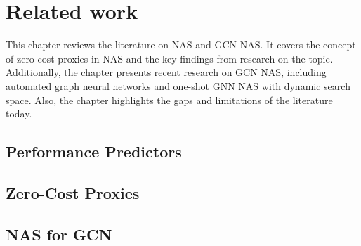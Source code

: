 \chapter{Related work}\label{chapter3}

This chapter reviews the literature on \gls{NAS} and \gls{GCN} \gls{NAS}. It covers the concept of zero-cost proxies in \gls{NAS} and the key findings from research on the topic. Additionally, the chapter presents recent research on \gls{GCN} \gls{NAS}, including automated graph neural networks and one-shot \gls{GNN} \gls{NAS} with dynamic search space. Also, the chapter highlights the gaps and limitations of the literature today.  

\section{Performance Predictors}\label{sec:rel_performance}

\section{Zero-Cost Proxies}




\section{NAS for GCN}\label{sec:nas_gcn}



